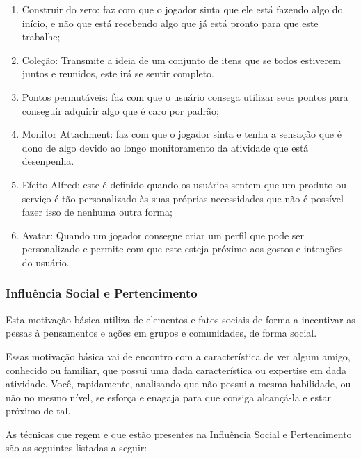 \begin{enumerate}
    \item Construir do zero: faz com que o jogador sinta que ele está
        fazendo algo do início, e não que está recebendo algo que
        já está pronto para que este trabalhe;
    \item Coleção: Transmite a ideia de um conjunto de itens que se todos
        estiverem juntos e reunidos, este irá se sentir completo.
    \item Pontos permutáveis: faz com que o usuário consega utilizar
        seus pontos para conseguir adquirir algo que é caro por padrão;
    \item Monitor Attachment: faz com que o jogador sinta e tenha a
        sensação que é dono de algo devido ao longo monitoramento
        da atividade que está desenpenha.
    \item Efeito Alfred: este é definido quando os usuários
        sentem que um produto ou serviço é tão personalizado às
        suas próprias necessidades que não é possível fazer isso
        de nenhuma outra forma;
    \item Avatar: Quando um jogador consegue criar um perfil que pode ser
        personalizado e permite com que este esteja próximo aos gostos e
        intenções do usuário.
\end{enumerate}

\subsubsection{Influência Social e Pertencimento}
\label{sub:influenciasocialepertencimento}
Esta motivação básica utiliza de elementos e fatos sociais de forma
a incentivar as pessas à pensamentos e ações em grupos e comunidades,
de forma social.

Essas motivação básica vai de encontro com a característica de ver algum
amigo, conhecido ou familiar, que possui uma dada característica ou expertise
em dada atividade. Você, rapidamente, analisando que não possui a mesma
habilidade, ou não no mesmo nível, se esforça e enagaja para que consiga
alcançá-la e estar próximo de tal.

As técnicas que regem e que estão presentes na Influência Social e Pertencimento
são as seguintes listadas a seguir:

